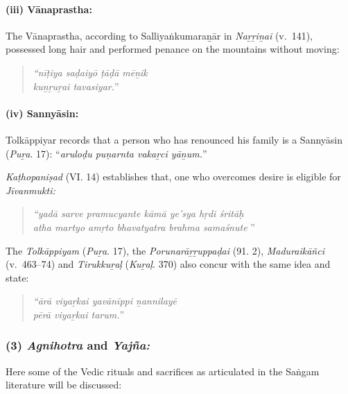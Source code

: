 \paragraph*{(iii) Vānaprastha:}

\vskip -7pt

The Vānaprastha, according to Salliyaṅkumaraṉār in \textit{Naṟṟiṉai} (v.~141), possessed long hair and performed penance on the mountains without moving:

\begin{quote}
\textit{“nīṭiya saḍaiyō ṭāḍā mēṉik}\\\textit{kuṉṟuṟai tavasiyar.}”
\end{quote}


\paragraph*{(iv) Sannyāsin:}

\vskip -7pt

Tolkāppiyar records that a person who has renounced his family is a Sannyāsin (\textit{Puṟa}. 17): “\textit{aruloḍu puṇarnta vakaṟci yāṉum.}”

\textit{Kaṭhopaniṣad} (VI. 14) establishes that, one who overcomes desire is eligible for \textit{Jīvanmukti:}

\begin{quote}
\textit{“yadā sarve pramucyante kāmā ye’sya hṛdi śritāḥ}\\\textit{atha martyo amṛto bhavatyatra brahma samaśnute }”
\end{quote}

The \textit{Tolkāppiyam} (\textit{Puṟa}. 17), the \textit{Porunarāṟṟuppaḍai} (91. 2), \textit{Maduraikāñci} (v.~463–74) and \textit{Tirukkuṟaḷ} (\textit{Kuṟaḷ}. 370) also concur with the same idea and state:

\begin{quote}
\textit{“ārā viyaṟkai yavānīppi ṉannilayē}\\\textit{pērā viyaṟkai tarum.}”
\end{quote}



\subsubsection*{(3) \textit{Agnihotra} and \textit{Yajña:}}

\vskip -7pt

Here some of the Vedic rituals and sacrifices as articulated in the Saṅgam literature will be discussed:

